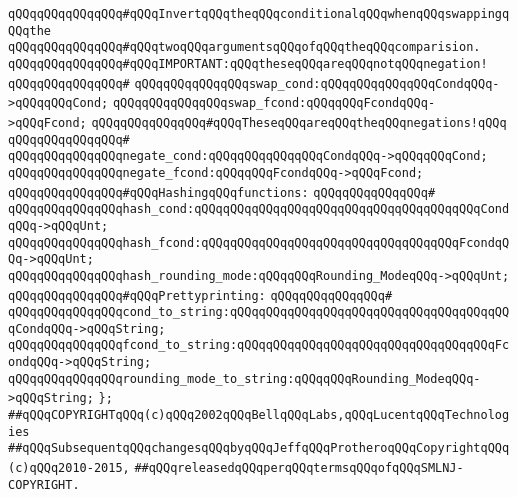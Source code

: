 \newline
\verb|qQQqqQQqqQQqqQQq#qQQqInvertqQQqtheqQQqconditionalqQQqwhenqQQqswappingqQQqthe|\newline
\verb|qQQqqQQqqQQqqQQq#qQQqtwoqQQqargumentsqQQqofqQQqtheqQQqcomparision.|\newline
\verb|qQQqqQQqqQQqqQQq#qQQqIMPORTANT:qQQqtheseqQQqareqQQqnotqQQqnegation!|\newline
\verb|qQQqqQQqqQQqqQQq#|\newline
\verb|qQQqqQQqqQQqqQQqswap_cond:qQQqqQQqqQQqqQQqCondqQQq->qQQqqQQqCond;|\newline
\verb|qQQqqQQqqQQqqQQqswap_fcond:qQQqqQQqFcondqQQq->qQQqFcond;|\newline
\newline
\verb|qQQqqQQqqQQqqQQq#qQQqTheseqQQqareqQQqtheqQQqnegations!qQQq|\newline
\verb|qQQqqQQqqQQqqQQq#|\newline
\verb|qQQqqQQqqQQqqQQqnegate_cond:qQQqqQQqqQQqqQQqCondqQQq->qQQqqQQqCond;|\newline
\verb|qQQqqQQqqQQqqQQqnegate_fcond:qQQqqQQqFcondqQQq->qQQqFcond;|\newline
\newline
\verb|qQQqqQQqqQQqqQQq#qQQqHashingqQQqfunctions:|\newline
\verb|qQQqqQQqqQQqqQQq#|\newline
\verb|qQQqqQQqqQQqqQQqhash_cond:qQQqqQQqqQQqqQQqqQQqqQQqqQQqqQQqqQQqqQQqCondqQQq->qQQqUnt;|\newline
\verb|qQQqqQQqqQQqqQQqhash_fcond:qQQqqQQqqQQqqQQqqQQqqQQqqQQqqQQqqQQqFcondqQQq->qQQqUnt;|\newline
\verb|qQQqqQQqqQQqqQQqhash_rounding_mode:qQQqqQQqRounding_ModeqQQq->qQQqUnt;|\newline
\newline
\verb|qQQqqQQqqQQqqQQq#qQQqPrettyprinting:|\newline
\verb|qQQqqQQqqQQqqQQq#|\newline
\verb|qQQqqQQqqQQqqQQqcond_to_string:qQQqqQQqqQQqqQQqqQQqqQQqqQQqqQQqqQQqqQQqCondqQQq->qQQqString;|\newline
\verb|qQQqqQQqqQQqqQQqfcond_to_string:qQQqqQQqqQQqqQQqqQQqqQQqqQQqqQQqqQQqFcondqQQq->qQQqString;|\newline
\verb|qQQqqQQqqQQqqQQqrounding_mode_to_string:qQQqqQQqRounding_ModeqQQq->qQQqString;|\newline
\newline
\verb|};|\newline
\newline
\newline
\verb|##qQQqCOPYRIGHTqQQq(c)qQQq2002qQQqBellqQQqLabs,qQQqLucentqQQqTechnologies|\newline
\verb|##qQQqSubsequentqQQqchangesqQQqbyqQQqJeffqQQqProtheroqQQqCopyrightqQQq(c)qQQq2010-2015,|\newline
\verb|##qQQqreleasedqQQqperqQQqtermsqQQqofqQQqSMLNJ-COPYRIGHT.|\newline

